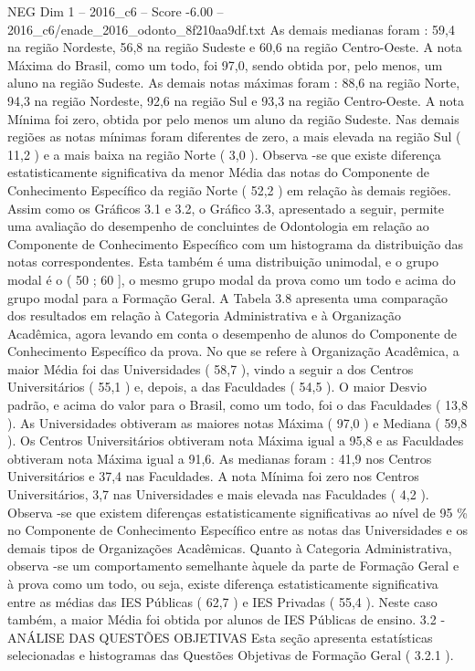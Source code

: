 \begin{textsample}{NEG Dim 1 – 2016\_c6 – Score -6.00 – 2016\_c6/enade\_2016\_odonto\_8f210aa9df.txt}
As demais medianas foram : 59,4 na região Nordeste, 56,8 na região Sudeste e 60,6 na região Centro-Oeste.
A nota Máxima do Brasil, como um todo, foi 97,0, sendo obtida por, pelo menos, um aluno na região Sudeste.
As demais notas máximas foram : 88,6 na região Norte, 94,3 na região Nordeste, 92,6 na região Sul e 93,3 na região Centro-Oeste.
A nota Mínima foi zero, obtida por pelo menos um aluno da região Sudeste.
Nas demais regiões as notas mínimas foram diferentes de zero, a mais elevada na região Sul ( 11,2 ) e a mais baixa na região Norte ( 3,0 ).
Observa -se que existe diferença estatisticamente significativa da menor Média das notas do Componente de Conhecimento Específico da região Norte ( 52,2 ) em relação às demais regiões.
Assim como os Gráficos 3.1 e 3.2, o Gráfico 3.3, apresentado a seguir, permite uma avaliação do desempenho de concluintes de Odontologia em relação ao Componente de Conhecimento Específico com um histograma da distribuição das notas correspondentes.
Esta também é uma distribuição unimodal, e o grupo modal é o ( 50 ; 60 ], o mesmo grupo modal da prova como um todo e acima do grupo modal para a Formação Geral.
A Tabela 3.8 apresenta uma comparação dos resultados em relação à Categoria Administrativa e à Organização Acadêmica, agora levando em conta o desempenho de alunos do Componente de Conhecimento Específico da prova.
No que se refere à Organização Acadêmica, a maior Média foi das Universidades ( 58,7 ), vindo a seguir a dos Centros Universitários ( 55,1 ) e, depois, a das Faculdades ( 54,5 ).
O maior Desvio padrão, e acima do valor para o Brasil, como um todo, foi o das Faculdades ( 13,8 ).
As Universidades obtiveram as maiores notas Máxima ( 97,0 ) e Mediana ( 59,8 ).
Os Centros Universitários obtiveram nota Máxima igual a 95,8 e as Faculdades obtiveram nota Máxima igual a 91,6.
As medianas foram : 41,9 nos Centros Universitários e 37,4 nas Faculdades.
A nota Mínima foi zero nos Centros Universitários, 3,7 nas Universidades e mais elevada nas Faculdades ( 4,2 ).
Observa -se que existem diferenças estatisticamente significativas ao nível de 95 \% no Componente de Conhecimento Específico entre as notas das Universidades e os demais tipos de Organizações Acadêmicas.
Quanto à Categoria Administrativa, observa -se um comportamento semelhante àquele da parte de Formação Geral e à prova como um todo, ou seja, existe diferença estatisticamente significativa entre as médias das IES Públicas ( 62,7 ) e IES Privadas ( 55,4 ).
Neste caso também, a maior Média foi obtida por alunos de IES Públicas de ensino. 3.2 - ANÁLISE DAS QUESTÕES OBJETIVAS Esta seção apresenta estatísticas selecionadas e histogramas das Questões Objetivas de Formação Geral ( 3.2.1 ).

\end{textsample}
